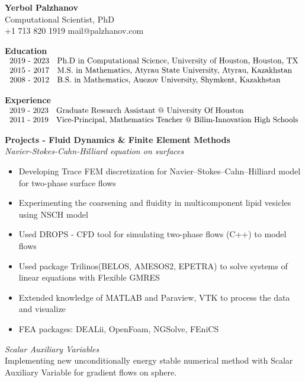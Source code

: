 \documentclass[10pt,letterpaper]{letter}
\begin{document}
	\begin{center}
\textbf{	Yerbol Palzhanov}\\ Computational Scientist, PhD\\
+1 713 820 1919 \quad mail@palzhanov.com
	\end{center}
\textbf{Education}\\
$\begin{array}{r l }
\text{2019 - 2023} & \text{Ph.D in Computational Science, University of Houston, Houston, TX} \\
\text{2015 - 2017} & \text{M.S. in Mathematics, Atyrau State University, Atyrau, Kazakhstan}\\
 \text{2008 - 2012} & \text{B.S. in Mathematics, Auezov University, Shymkent, Kazakhstan}
\end{array}$


\textbf{Experience}\\
$\begin{array}{r l }
\text{2019 - 2023} & \text{Graduate Research Assistant @ University Of Houston} \\
\text{2011 - 2019} & \text{Vice-Principal, Mathematics Teacher @ Bilim-Innovation High Schools} 
\end{array}$



\textbf{Projects - Fluid Dynamics \& Finite Element Methods}\\
\textit{Navier-Stokes-Cahn-Hilliard equation on surfaces}
\begin{itemize}
	\item {Developing Trace FEM discretization for Navier–Stokes–Cahn–Hilliard model
		for two-phase surface flows}
	\item {Experimenting the coarsening and fluidity in multicomponent lipid vesicles using NSCH model}
	\item {Used DROPS - CFD tool for simulating two-phase flows (C++) to model flows}
	\item {Used package Trilinos(BELOS, AMESOS2, EPETRA) to solve systems of linear equations with Flexible GMRES}
	\item {Extended knowledge of MATLAB and Paraview, VTK to process the data and visualize }
	\item {FEA packages: DEALii, OpenFoam, NGSolve, FEniCS}
\end{itemize}
\textit{Scalar Auxiliary Variables}\\
\hspace*{10mm} Implementing new unconditionally energy stable numerical method with Scalar Auxiliary Variable 
for gradient flows 
\hspace*{10mm} on sphere.
\end{document}
